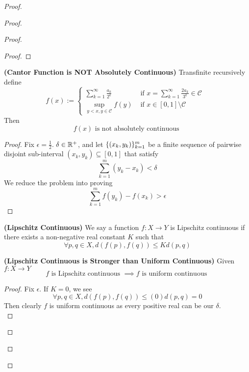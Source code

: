 \documentclass{report}
\begin{document}
\begin{proof}
\begin{proof}
\begin{proof}
\begin{proof}
\end{proof}
\begin{theorem}
\textbf{(Cantor Function is NOT Absolutely Continuous)} Transfinite recursively define 
\begin{equation*}
f(x):=\begin{cases}
  \sum_{k=1}^\infty \frac{a_k}{2^k}& \text{ if $x=\sum_{k=1}^\infty \frac{2a_k}{3^k}\in \mathcal{C}$ }\\
  \sup_{y<x,y \in \mathcal{C}} f(y)& \text{ if $x\in [0,1]\setminus \mathcal{C}$ }
\end{cases}
\end{equation*}
Then 
\begin{equation*}
f(x)\text{ is not absolutely continuous }
\end{equation*}
\end{theorem}
\begin{proof}
Fix $\epsilon =\frac{1}{2}$.  $\delta\in\mathbb{R}^+$, and let $\{ (x_k,y_k) \}_{k=1}^m$ be a finite sequence of pairwise disjoint sub-interval $(x_k,y_k)\subseteq [0,1]$ that satisfy
\begin{equation*}
\sum_{k=1}^m (y_k-x_k)<\delta
\end{equation*}
We reduce the problem into proving 
\begin{equation*}
\sum_{k=1}^m f(y_k)-f(x_k)>\epsilon 
\end{equation*}
\end{proof}
\begin{definition}
\label{5.3.3}
\textbf{(Lipschitz Continuous)} We say a function $f:X\rightarrow Y$ is Lipschitz continuous if there exists a non-negative real constant $K$ such that 
\begin{equation*}
\forall p,q\in X, d(f(p),f(q))\leq Kd(p,q)
\end{equation*}
\end{definition}
\begin{theorem}
\label{5.3.4}
\textbf{(Lipschitz Continuous is Stronger than Uniform Continuous)} Given $f:X\rightarrow Y$
\begin{equation*}
f\text{ is Lipschitz continuous }\implies f\text{ is uniform continuous }
\end{equation*}
\end{theorem}
\begin{proof}
Fix $\epsilon $. If $K=0$, we see 
 \begin{equation*}
\forall p,q\in X, d(f(p),f(q))\leq (0)d(p,q)=0
\end{equation*}
Then clearly $f$ is uniform continuous as every positive real can be our $\delta$.\\



\end{proof}
\end{proof}
\end{proof}
\end{proof}
\end{document}
